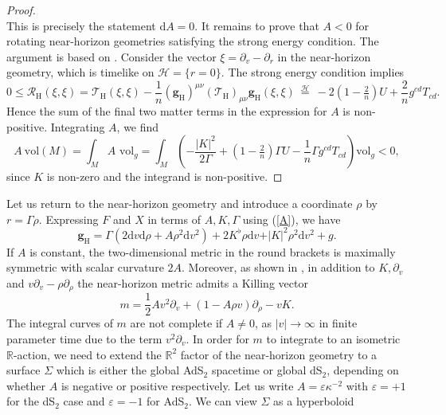 \documentclass[11pt, reqno]{amsart}
\newcommand{\R}{\mathbb{R}}
\theoremstyle{plain}
\theoremstyle{definition}
\numberwithin{equation}{section}
\begin{document}
\begin{proof}
\begin{equation*}
    \end{equation*}
    This is precisely the statement d$A = 0$. It remains to prove that $A < 0$ for rotating near-horizon geometries satisfying the strong energy condition. The argument is based on \cite{KLR,KL13}. Consider the vector $\xi = \partial_v - \partial_r$ in the near-horizon geometry, which is timelike on $\mathcal{H} = \{r = 0\}$. The strong energy condition implies
\begin{equation*}
    0 \leq \mathcal{R}_{\text{H}}(\xi,\xi)= \mathcal{T}_{\text{H}}(\xi,\xi)-\frac 1n (\textbf{g}_{\text{H}})^{\mu\nu}(\mathcal{T}_{\text{H}})_{\mu\nu} \textbf{g}_{\text{H}}(\xi,\xi)\:\overset{\mathcal{H}}{=}\: -2(1-\tfrac 2n)U + \frac 2n g^{cd}T_{cd}.
\end{equation*}
Hence the sum of the final two matter terms in the expression for $A$ is non-positive. Integrating $A$, we find
\begin{equation*}
    A\:\text{vol}(M) = \int_M A \text{ vol}_g = \int_M\left(-\frac{\vert K \vert^2}{2\Gamma} + (1-\tfrac 2n)\Gamma U - \frac 1n\Gamma g^{cd}T_{cd}\right)\text{vol}_g < 0,
\end{equation*}
since $K$ is non-zero and the integrand is non-positive.
\end{proof}
Let us return to the near-horizon geometry and introduce a coordinate $\rho$ by $r = \Gamma \rho$. Expressing $F$ and $X$ in terms of $A,K,\Gamma$ using (\ref{A}), we have
\begin{equation} \label{nhgenh}
    \textbf{g}_{\text{H}} = \Gamma(2\text{d}v\text{d}\rho + A\rho^2\text{d}v^2) + 2 K^\flat \rho\text{d}v + \vert K \vert^2 \rho^2\text{d}v^2 + g.
\end{equation}
If $A$ is constant, the two-dimensional metric in the round brackets is maximally symmetric with scalar curvature $2A$. Moreover, as shown in \cite{DL}, in addition to $K, \partial_v$ and $v\partial_v - \rho\partial_\rho$ the near-horizon metric admits a Killing vector
\begin{equation} \label{mkv}
    m= \frac12Av^2\partial_v + (1-A\rho v)\partial_\rho - vK.
\end{equation}
The integral curves of $m$ are not complete if $A \neq 0$, as $\vert v \vert \to \infty$ in finite parameter time due to the term $v^2\partial_v$. In order for $m$ to integrate to an isometric $\R$-action, we need to extend the $\R^2$ factor of the near-horizon geometry to a surface $\Sigma$ which is either the global AdS$_2$ spacetime or global dS$_2$, depending on whether $A$ is negative or positive respectively. Let us write $A = \varepsilon\kappa^{-2}$ with $\varepsilon = +1$ for the dS$_2$ case and $\varepsilon = -1$ for AdS$_2$. We can view $\Sigma$ as a hyperboloid
\end{document}
